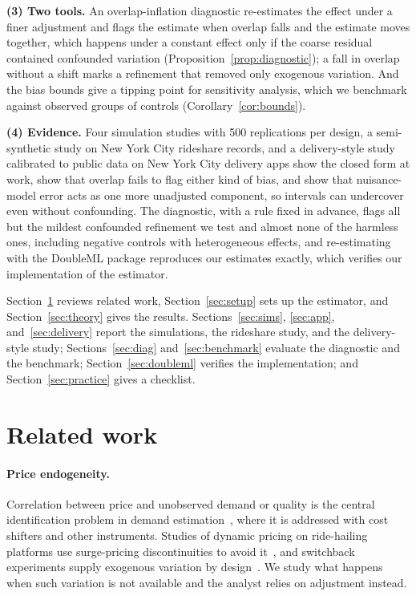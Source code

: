 \documentclass[11pt]{article}
\theoremstyle{remark}
\begin{document}
\textbf{(3) Two tools.} An overlap-inflation diagnostic re-estimates the effect under a finer adjustment and flags the estimate when overlap falls and the estimate moves together, which happens under a constant effect only if the coarse residual contained confounded variation (Proposition~\ref{prop:diagnostic}); a fall in overlap without a shift marks a refinement that removed only exogenous variation. And the bias bounds give a tipping point for sensitivity analysis, which we benchmark against observed groups of controls (Corollary~\ref{cor:bounds}).

\textbf{(4) Evidence.} Four simulation studies with 500 replications per design, a semi-synthetic study on New York City rideshare records, and a delivery-style study calibrated to public data on New York City delivery apps show the closed form at work, show that overlap fails to flag either kind of bias, and show that nuisance-model error acts as one more unadjusted component, so intervals can undercover even without confounding. The diagnostic, with a rule fixed in advance, flags all but the mildest confounded refinement we test and almost none of the harmless ones, including negative controls with heterogeneous effects, and re-estimating with the DoubleML package reproduces our estimates exactly, which verifies our implementation of the estimator.

Section~\ref{sec:related} reviews related work, Section~\ref{sec:setup} sets up the estimator, and Section~\ref{sec:theory} gives the results. Sections~\ref{sec:sims}, \ref{sec:app}, and~\ref{sec:delivery} report the simulations, the rideshare study, and the delivery-style study; Sections~\ref{sec:diag} and~\ref{sec:benchmark} evaluate the diagnostic and the benchmark; Section~\ref{sec:doubleml} verifies the implementation; and Section~\ref{sec:practice} gives a checklist.

\section{Related work}
\label{sec:related}

\paragraph{Price endogeneity.} Correlation between price and unobserved demand or quality is the central identification problem in demand estimation~\citep{berry1994, blp1995}, where it is addressed with cost shifters and other instruments. Studies of dynamic pricing on ride-hailing platforms use surge-pricing discontinuities to avoid it~\citep{chen2016, cohen2016}, and switchback experiments supply exogenous variation by design~\citep{bojinov2023}. We study what happens when such variation is not available and the analyst relies on adjustment instead.
\end{document}

